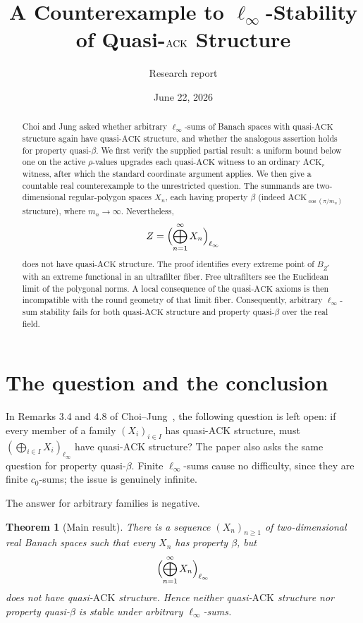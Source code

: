 \documentclass[11pt]{article}
\title{A Counterexample to $\ell_\infty$-Stability of Quasi-$\ACK$ Structure}
\author{Research report}
\date{June 22, 2026}
\newtheorem{theorem}{Theorem}[section]
\theoremstyle{definition}
\newcommand{\ACK}{\mathrm{ACK}}
\begin{document}
\maketitle

\begin{abstract}
Choi and Jung asked whether arbitrary $\ell_\infty$-sums of Banach spaces
with quasi-$\ACK$ structure again have quasi-$\ACK$ structure, and whether
the analogous assertion holds for property quasi-$\beta$.  We first verify
the supplied partial result: a uniform bound below one on the active
$\rho$-values upgrades each quasi-$\ACK$ witness to an ordinary
$\ACK_r$ witness, after which the standard coordinate argument applies.
We then give a countable real counterexample to the unrestricted question.
The summands are two-dimensional regular-polygon spaces $X_n$, each having
property $\beta$ (indeed $\ACK_{\cos(\pi/m_n)}$ structure), where
$m_n\to\infty$.  Nevertheless,
\[
   Z=\Bigl(\bigoplus_{n=1}^\infty X_n\Bigr)_{\ell_\infty}
\]
does not have quasi-$\ACK$ structure.  The proof identifies every extreme
point of $B_{Z^*}$ with an extreme functional in an ultrafilter fiber.  Free
ultrafilters see the Euclidean limit of the polygonal norms.  A local
consequence of the quasi-$\ACK$ axioms is then incompatible with the round
geometry of that limit fiber.  Consequently, arbitrary $\ell_\infty$-sum
stability fails for both quasi-$\ACK$ structure and property quasi-$\beta$
over the real field.
\end{abstract}

\section{The question and the conclusion}

In Remarks 3.4 and 4.8 of Choi--Jung~\cite{ChoiJung}, the following question
is left open: if every member of a family $(X_i)_{i\in I}$ has quasi-$\ACK$
structure, must $(\bigoplus_{i\in I}X_i)_{\ell_\infty}$ have quasi-$\ACK$
structure?  The paper also asks the same question for property quasi-$\beta$.
Finite $\ell_\infty$-sums cause no difficulty, since they are finite
$c_0$-sums; the issue is genuinely infinite.

The answer for arbitrary families is negative.

\begin{theorem}[Main result]\label{thm:main}
There is a sequence $(X_n)_{n\ge1}$ of two-dimensional real Banach spaces
such that every $X_n$ has property $\beta$, but
\[
   \Bigl(\bigoplus_{n=1}^\infty X_n\Bigr)_{\ell_\infty}
\]
does not have quasi-$\ACK$ structure.  Hence neither quasi-$\ACK$ structure
nor property quasi-$\beta$ is stable under arbitrary $\ell_\infty$-sums.
\end{theorem}
\end{document}
